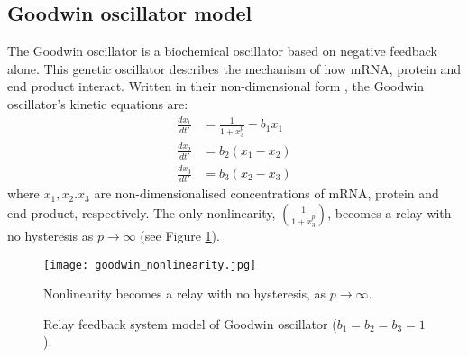 \documentclass[a4paper, 12pt]{article}
\begin{document}
\subsection{Goodwin oscillator model}
The Goodwin oscillator is a biochemical oscillator based on negative feedback alone. This genetic oscillator  describes the mechanism of how mRNA, protein and end product interact. Written in their non-dimensional form \cite{fall}, the Goodwin oscillator's kinetic equations are:
\begin{align}
\frac{dx_1}{dt'} &= \frac{1}{1 + x_3^p} - b_1x_1 \\
\frac{dx_2}{dt'} &= b_2(x_1 - x_2) \\
\frac{dx_3}{dt'} &= b_3(x_2 - x_3)
\end{align}
where $x_1,x_2.x_3$ are non-dimensionalised concentrations of mRNA, protein and end product, respectively. 
\noindent The only nonlinearity, $(\frac{1}{1 + x_3^p})$, becomes a relay with no hysteresis as $p \rightarrow \infty$ (see Figure \ref{goodwin_nonlinearity}).

\begin{figure}[h!]
\centering
\texttt{[image: goodwin\_nonlinearity.jpg]}
\caption{Nonlinearity becomes a relay with no hysteresis, as $p \rightarrow \infty$.}
\label{goodwin_nonlinearity}
\end{figure}
\begin{figure}[h!]
\centering
\caption{Relay feedback system model of Goodwin oscillator ($b_1=b_2=b_3=1$). }
\label{goodwin_transfer}
\end{figure}
\end{document}
